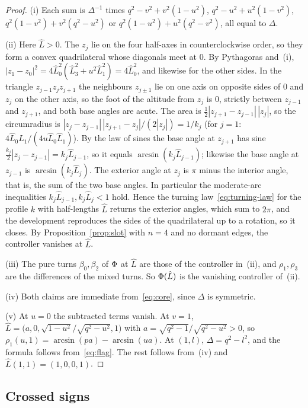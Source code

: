 \begin{proof}
(i) Each sum is $\Delta^{-1}$ times $q^2-v^2+v^2(1-u^2)$,
$q^2-u^2+u^2(1-v^2)$, $q^2(1-v^2)+v^2(q^2-u^2)$ or
$q^2(1-u^2)+u^2(q^2-v^2)$, all equal to $\Delta$.

(ii) Here $\hat L>0$. The $z_j$ lie on the four half-axes in counterclockwise
order, so they form a convex quadrilateral whose diagonals meet at $0$. By
Pythagoras and~(i), $|z_1-z_0|^2=4\hat L_0^2(\hat L_3^2+u^2\hat L_1^2)=4\hat L_0^2$,
and likewise for the other sides. In the triangle $z_{j-1}z_jz_{j+1}$ the
neighbours $z_{j\pm1}$ lie on one axis on opposite sides of $0$ and $z_j$ on
the other axis, so the foot of the altitude from $z_j$ is $0$, strictly
between $z_{j-1}$ and $z_{j+1}$, and both base angles are acute. The area is
$\frac12|z_{j+1}-z_{j-1}|\,|z_j|$, so the circumradius is
$|z_j-z_{j-1}|\,|z_{j+1}-z_j|/(2|z_j|)=1/k_j$ (for $j=1$:
$4\hat L_0\hat L_1/(4u\hat L_0\hat L_1)$). By the law of sines the base angle
at $z_{j+1}$ has sine $\frac{k_j}{2}|z_j-z_{j-1}|=k_j\hat L_{j-1}$, so it equals
$\arcsin(k_j\hat L_{j-1})$; likewise the base angle at $z_{j-1}$ is
$\arcsin(k_j\hat L_j)$. The exterior angle at $z_j$ is $\pi$ minus the
interior angle, that is, the sum of the two base angles. In particular the
moderate-arc inequalities $k_j\hat L_{j-1},k_j\hat L_j<1$ hold. Hence the
turning law~\eqref{eq:turning-law} for the profile $k$ with half-lengths
$\hat L$ returns the exterior angles, which sum to $2\pi$, and the development
reproduces the sides of the quadrilateral up to a rotation, so it closes. By
Proposition~\ref{prop:slot} with $n=4$ and no dormant edges, the controller
vanishes at $\hat L$.

(iii) The pure turns $\beta_0,\beta_2$ of $\Phi$ at $\hat L$ are those of
the controller in~(ii), and $\rho_1,\rho_3$ are the differences of the mixed
turns. So $\Phi(\hat L)$ is the vanishing controller of~(ii).

(iv) Both claims are immediate from~\eqref{eq:core}, since $\Delta$ is
symmetric.

(v) At $u=0$ the subtracted terms vanish. At $v=1$,
$\hat L=\bigl(a,0,\sqrt{1-u^2}/\sqrt{q^2-u^2},1\bigr)$ with
$a=\sqrt{q^2-1}/\sqrt{q^2-u^2}>0$, so
$\rho_1(u,1)=\arcsin(pa)-\arcsin(ua)$. At $(1,l)$, $\Delta=q^2-l^2$, and the
formula follows from~\eqref{eq:flag}. The rest follows from~(iv) and
$\hat L(1,1)=(1,0,0,1)$.
\end{proof}

\subsection{Crossed signs}

